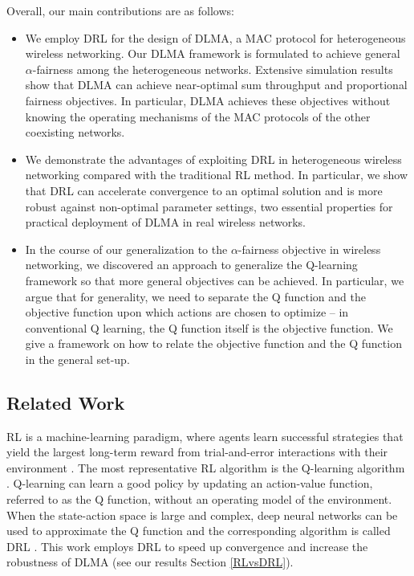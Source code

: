 \documentclass[journal,comsoc]{IEEEtran}
\begin{document}
Overall, our main contributions are as follows:
\begin{itemize}
\item 	We employ DRL for the design of DLMA, a MAC protocol for heterogeneous wireless networking. Our DLMA framework is formulated to achieve general  $ \alpha $-fairness among the heterogeneous networks.  Extensive simulation results show that  DLMA can achieve near-optimal sum throughput and proportional fairness objectives. In particular, DLMA achieves these objectives without knowing the operating mechanisms of the MAC protocols of the other coexisting networks. 
\item We demonstrate the advantages of exploiting DRL in heterogeneous wireless networking compared with the traditional RL method.  In particular, we show that DRL can accelerate convergence to an optimal solution and is more robust against non-optimal parameter settings, two essential properties for practical deployment of DLMA in real wireless networks.  
\item In the course of our generalization to the  $ \alpha $-fairness objective in wireless networking, we discovered an approach to generalize the Q-learning framework so that more general objectives can be achieved. In particular, we argue that for generality, we need to separate the Q function and the objective function upon which actions are chosen to optimize -- in conventional Q learning, the Q function itself is the objective function. We give a framework on how to relate the objective function and the Q function in the general set-up. 
\end{itemize}
\subsection{Related Work}
RL is a machine-learning paradigm, where agents learn successful strategies that yield the largest long-term reward from trial-and-error interactions with their environment \cite{sutton1998reinforcement}. The most representative RL algorithm is the Q-learning algorithm \cite{watkins1992q}. Q-learning can learn a good policy by updating an action-value function, referred to as the Q function, without an operating model of the environment. When the state-action space is large and complex, deep neural networks can be used to approximate the Q function and the corresponding algorithm is called DRL \cite{DQNpaper}. This work employs DRL to speed up convergence and increase the robustness of DLMA (see our results Section \ref{RLvsDRL}).
\end{document}
